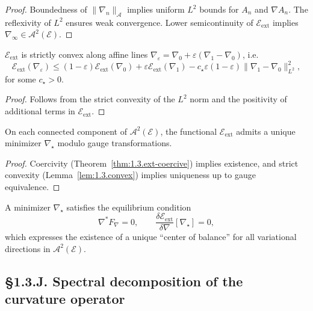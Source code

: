 \begin{proof}
Boundedness of $\|\nabla_n\|_{\mathcal A}$ implies uniform $L^2$ bounds for $A_n$ and $\nabla A_n$.  
The reflexivity of $L^2$ ensures weak convergence. 
Lower semicontinuity of $\mathcal E_{\mathrm{ext}}$ implies $\nabla_\infty\in \mathcal A^2(\mathcal E)$.
\end{proof}

\begin{lemma}\label{lem:1.3.convex}
$\mathcal E_{\mathrm{ext}}$ is strictly convex along affine lines $\nabla_\varepsilon=\nabla_0+\varepsilon(\nabla_1-\nabla_0)$, i.e.
\[
\mathcal E_{\mathrm{ext}}(\nabla_\varepsilon)
 \le (1-\varepsilon)\mathcal E_{\mathrm{ext}}(\nabla_0)
   +\varepsilon \mathcal E_{\mathrm{ext}}(\nabla_1)
   - c_\star \varepsilon(1-\varepsilon)\|\nabla_1-\nabla_0\|_{L^2}^2,
\]
for some $c_\star>0$.
\end{lemma}

\begin{proof}
Follows from the strict convexity of the $L^2$ norm and the positivity of additional terms in $\mathcal E_{\mathrm{ext}}$.
\end{proof}

\begin{theorem}\label{thm:1.3.unique}
On each connected component of $\mathcal A^2(\mathcal E)$, the functional $\mathcal E_{\mathrm{ext}}$ admits a unique minimizer $\nabla_\star$ modulo gauge transformations.
\end{theorem}

\begin{proof}
Coercivity (Theorem~\ref{thm:1.3.ext-coercive}) implies existence, and strict convexity (Lemma~\ref{lem:1.3.convex}) implies uniqueness up to gauge equivalence.
\end{proof}

\begin{definition}
A minimizer $\nabla_\star$ satisfies the equilibrium condition
\[
\nabla^\ast F_\nabla = 0,\qquad 
\frac{\delta\mathcal E_{\mathrm{ext}}}{\delta \nabla}[\nabla_\star]=0,
\]
which expresses the existence of a unique ``center of balance'' for all variational directions in $\mathcal A^2(\mathcal E)$.
\end{definition}

\subsection*{§1.3.J. Spectral decomposition of the curvature operator}

